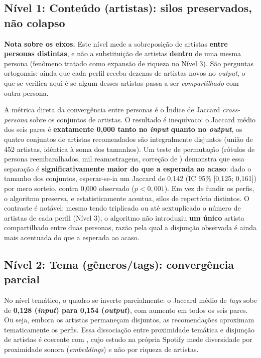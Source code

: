 \documentclass[12pt, %
openright,
oneside, %
a4paper,    %
english,   %
brazil]{facom-ufu-abntex2}
\begin{document}
\subsection*{Nível 1: Conteúdo (artistas): silos preservados, não colapso}

\noindent\textbf{Nota sobre os eixos.} Este nível mede a sobreposição de artistas
\textbf{entre personas distintas}, e não a substituição de artistas
\textbf{dentro} de uma mesma persona (fenômeno tratado como expansão de riqueza
no Nível 3). São perguntas ortogonais: ainda que cada perfil receba dezenas de
artistas novos no \emph{output}, o que se verifica aqui é se algum desses
artistas passa a ser \emph{compartilhado} com outra persona.

A métrica direta da convergência entre personas é o Índice de Jaccard
\emph{cross-persona} sobre os conjuntos de artistas. O resultado é inequívoco: o
Jaccard médio dos seis pares é \textbf{exatamente 0,000 tanto no \emph{input}
quanto no \emph{output}}, os quatro conjuntos de artistas recomendados são
integralmente disjuntos (união de 452 artistas, idêntica à soma dos tamanhos). Um
teste de permutação (rótulos de persona reembaralhados, mil reamostragens,
correção de ) demonstra que essa separação é
\textbf{significativamente maior do que a esperada ao acaso}: dado o tamanho dos
conjuntos, esperar-se-ia um Jaccard de 0,142 (IC 95\% [0,125; 0,161]) por mero
sorteio, contra 0,000 observado ($p < 0{,}001$). Em vez de fundir os perfis, o
algoritmo preserva, e estatisticamente acentua, silos de repertório
distintos. O contraste é notável: mesmo tendo triplicado ou até sextuplicado o
número de artistas de cada perfil (Nível 3), o algoritmo não introduziu
\textbf{um único} artista compartilhado entre duas personas, razão pela qual a
disjunção observada é ainda mais acentuada do que a esperada ao acaso.

\subsection*{Nível 2: Tema (gêneros/tags): convergência parcial}

No nível temático, o quadro se inverte parcialmente: o Jaccard médio de
\emph{tags} sobe de \textbf{0,128 (\emph{input}) para 0,154 (\emph{output})}, com
aumento em todos os seis pares. Ou seja, embora os artistas permaneçam disjuntos,
as recomendações aproximam tematicamente os perfis. Essa dissociação entre
proximidade temática e disjunção de artistas é coerente com
, cujo estudo na própria Spotify mede
diversidade por proximidade sonora (\emph{embeddings}) e não por riqueza de
artistas.
\end{document}
